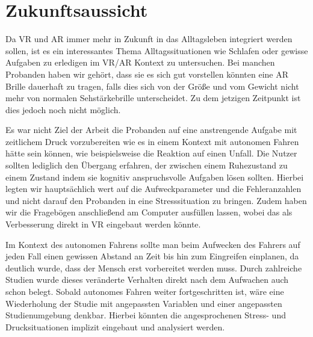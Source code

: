 \section{Zukunftsaussicht}


Da VR und AR immer mehr in Zukunft in das Alltagsleben integriert werden sollen, ist es ein interessantes Thema Alltagssituationen wie Schlafen oder gewisse Aufgaben zu erledigen im VR/AR Kontext zu untersuchen. Bei manchen Probanden haben wir gehört, dass sie es sich gut vorstellen könnten eine AR Brille dauerhaft zu tragen, falls dies sich von der Größe und vom Gewicht nicht mehr von normalen Sehstärkebrille unterscheidet. Zu dem jetzigen Zeitpunkt ist dies jedoch noch nicht möglich.

Es war nicht Ziel der Arbeit die Probanden auf eine anstrengende Aufgabe mit zeitlichem Druck vorzubereiten wie es in einem Kontext mit autonomen Fahren hätte sein können, wie beispielsweise die Reaktion auf einen Unfall. Die Nutzer sollten lediglich den Übergang erfahren, der zwischen einem Ruhezustand zu einem Zustand indem sie kognitiv anspruchsvolle Aufgaben lösen sollten. Hierbei legten wir hauptsächlich wert auf die Aufweckparameter und die Fehleranzahlen und nicht darauf den Probanden in eine Stresssituation zu bringen. 
Zudem haben wir die Fragebögen anschließend am Computer ausfüllen lassen, wobei das als Verbesserung direkt in VR eingebaut werden könnte.

Im Kontext des autonomen Fahrens sollte man beim Aufwecken des Fahrers auf jeden Fall einen gewissen Abstand an Zeit bis hin zum Eingreifen einplanen, da deutlich wurde, dass der Mensch erst vorbereitet werden muss. Durch zahlreiche Studien wurde dieses veränderte Verhalten direkt nach dem Aufwachen auch schon belegt. Sobald autonomes Fahren weiter fortgeschritten ist, wäre eine Wiederholung der Studie mit angepassten Variablen und einer angepassten Studienumgebung denkbar. Hierbei könnten die angesprochenen Stress- und Drucksituationen implizit eingebaut und analysiert werden.
